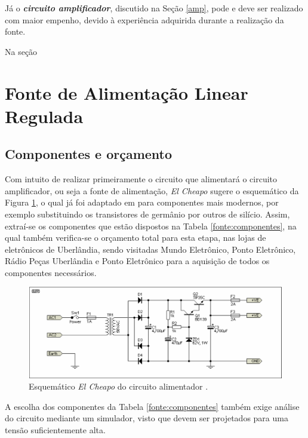 \documentclass[a4paper,12pt,oneside,openany,table,xcdraw]{article}
\begin{document}
Já o \textbf{\textit{circuito amplificador}}, discutido na Seção \ref{amp}, pode e deve ser realizado com maior empenho, devido à experiência adquirida durante a realização da fonte. 

Na seção 

\newpage
\section{Fonte de Alimentação Linear Regulada} \label{fonte}

\subsection{Componentes e orçamento} 
Com intuito de realizar primeiramente o circuito que alimentará o circuito amplificador, ou seja a fonte de alimentação, \emph{El Cheapo} sugere o esquemático da Figura \ref{fonte:esquematico}, o qual já foi adaptado em \cite{cheapo} para componentes mais modernos, por exemplo substituindo os transistores de germânio por outros de silício. Assim, extraí-se os componentes que estão dispostos na Tabela \ref{fonte:componentes}, na qual também verifica-se o orçamento total para esta etapa, nas lojas de eletrônicos de Uberlândia, sendo visitadas Mundo Eletrônico, Ponto Eletrônico, Rádio Peças Uberlândia e Ponto Eletrônico para a aquisição de todos os componentes necessários.
\vspace{0.2cm}

\begin{figure}[H]
\centering
\includegraphics[width=15cm]{fonte-esquematico}
\caption{Esquemático \emph{El Cheapo} do circuito alimentador \cite{cheapo}.}
\label{fonte:esquematico}
\end{figure}
\vspace{0.4cm}

A escolha dos componentes da Tabela \ref{fonte:componentes} também exige análise do circuito mediante um simulador, visto que devem ser projetados para uma tensão suficientemente alta.
\end{document}
